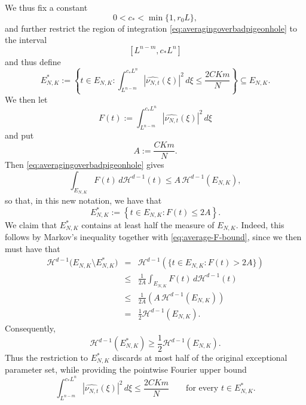 \documentclass[12pt]{amsart}
\numberwithin{equation}{section}
\begin{document}
We thus fix a constant
\begin{equation}\label{eq:safefrequencycutoff}
0<c_*<\min\{1,r_0L\},
\end{equation}
and further restrict the region of integration
\eqref{eq:averagingoverbadpigeonhole} to the interval
\[
[L^{n-m},c_*L^n]
\]
and thus define 
\[
E_{N,K}^*
:=
\left\{
t\in E_{N,K}:
\int_{L^{n-m}}^{c_*L^n}
\left|\widehat{\nu_{N,t}}(\xi)\right|^2\,d\xi
\leq\frac{2CKm}{N}
\right\} \subseteq E_{N,K}.
\]
We then let
\[
F(t)
:=
\int_{L^{n-m}}^{c_*L^n}
\left|\widehat{\nu_{N,t}}(\xi)\right|^2\,d\xi
\]
and put
\[
A:=\frac{CKm}{N}.
\]
Then \eqref{eq:averagingoverbadpigeonhole} gives
\begin{equation}\label{eq:average-F-bound}
\int_{E_{N,K}}F(t)\,d\mathcal H^{d-1}(t)
\leq
A\,\mathcal H^{d-1}(E_{N,K}),
\end{equation}
so that, in this new notation, we have that
\[
E_{N,K}^*
:=
\left\{
t\in E_{N,K}:F(t)\leq2A
\right\}.
\]
We claim that $E_{N,K}^*$ contains at least half the measure of
$E_{N,K}$. Indeed, this follows by Markov's inequality together with \eqref{eq:average-F-bound}, since we then must have that
\begin{eqnarray*}
\mathcal H^{d-1}
\bigl(E_{N,K}\setminus E_{N,K}^*\bigr)
&=&
\mathcal H^{d-1}
\left(
\{t\in E_{N,K}:F(t)>2A\}
\right)\\[1ex]
&\leq&
\frac{1}{2A}
\int_{E_{N,K}}F(t)\,d\mathcal H^{d-1}(t)\\[1ex]
&\leq&
\frac{1}{2A}
\left(
A\,\mathcal H^{d-1}(E_{N,K})
\right)\\[1ex]
&=&
\frac12\mathcal H^{d-1}(E_{N,K}).
\end{eqnarray*}
Consequently,
\begin{equation}\label{eq:good-exceptional-subset}
\mathcal H^{d-1}(E_{N,K}^*)
\geq
\frac12\mathcal H^{d-1}(E_{N,K}).
\end{equation}
Thus the restriction to $E_{N,K}^*$ discards at most half of the
original exceptional parameter set, while providing the pointwise
Fourier upper bound
\[
\int_{L^{n-m}}^{c_*L^n}
\left|\widehat{\nu_{N,t}}(\xi)\right|^2\,d\xi
\leq
\frac{2CKm}{N}
\qquad
\text{for every }t\in E_{N,K}^*.
\]
\end{document}
